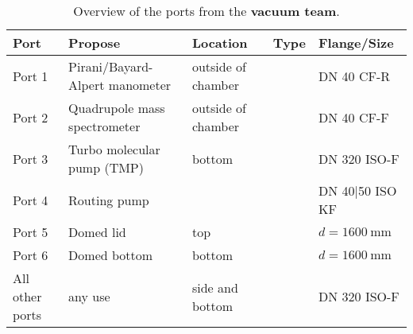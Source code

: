 \begin{table}[H]
    \centering
    \caption{Overview of the ports from the \textbf{vacuum team}.}
    \begin{tabular}{>{\raggedright\arraybackslash}p{2cm} >{\raggedright\arraybackslash}p{3cm} >{\raggedright\arraybackslash}p{3.5cm} >{\raggedright\arraybackslash}p{2cm} >{\raggedright\arraybackslash}p{3.5cm}}
        \toprule
        \textbf{Port}   & \textbf{Propose}               & \textbf{Location}  & \textbf{Type} & \textbf{Flange/Size}          \\
        \midrule
        Port 1          & Pirani/Bayard-Alpert manometer & outside of chamber &               & DN 40 CF-R                    \\
        Port 2          & Quadrupole mass spectrometer   & outside of chamber &               & DN 40 CF-F                    \\
        \midrule
        Port 3          & Turbo molecular pump (TMP)     & bottom             &               & DN 320 ISO-F                  \\
        Port 4          & Routing pump                   &                    &               & DN 40|50 ISO KF               \\
        \midrule
        Port 5          & Domed lid                      & top                &               & $d = 1600\ \si{\milli\meter}$ \\
        Port 6          & Domed bottom                   & bottom             &               & $d = 1600\ \si{\milli\meter}$ \\
        \midrule
        All other ports & any use                        & side and bottom    &               & DN 320 ISO-F                  \\
        \bottomrule
    \end{tabular}
    \label{tab:vacuum_ports}
\end{table}

